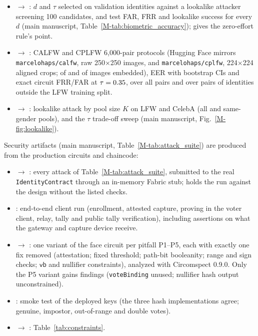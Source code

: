 \documentclass[10pt,letterpaper,journal]{IEEEtran}
\begin{document}
\begin{itemize}[leftmargin=*,noitemsep]
  \item {} $\rightarrow$ : $d$ and $\tau$ selected on validation identities against a lookalike attacker screening 100 candidates, and test FAR, FRR and lookalike success for every $d$ (main manuscript, Table~\ref{M-tab:biometric_accuracy});  gives the zero-effort rule's point.
  \item {} $\rightarrow$ : CALFW and CPLFW 6,000-pair protocols (Hugging Face mirrors \texttt{marcelohaps/calfw}, raw 250$\times$250 images, and \texttt{marcelohaps/cplfw}, 224$\times$224 aligned crops; \nCalfwEmbedded{} of \nCalfwImages{} and \nCplfwEmbedded{} of \nCplfwImages{} images embedded), EER with bootstrap CIs and exact circuit FRR/FAR at $\tau = 0.35$, over all pairs and over pairs of identities outside the LFW training split.
  \item {} $\rightarrow$ : lookalike attack by pool size $K$ on LFW and CelebA (all and same-gender pools), and the $\tau$ trade-off sweep (main manuscript, Fig.~\ref{M-fig:lookalike}).
\end{itemize}
Security artifacts (main manuscript, Table~\ref{M-tab:attack_suite}) are produced from the production circuits and chaincode:
\begin{itemize}[leftmargin=*,noitemsep]
  \item {} $\rightarrow$ : every attack of Table~\ref{M-tab:attack_suite}, submitted to the real \texttt{IdentityContract} through an in-memory Fabric stub;  holds the run against the design without the listed checks.
  \item {}: end-to-end client run (enrollment, attested capture, proving in the voter client, relay, tally and public tally verification), including assertions on what the gateway and capture device receive.
  \item {} $\rightarrow$ : one variant of the face circuit per pitfall P1--P5, each with exactly one fix removed (attestation; fixed threshold; path-bit booleanity; range and sign checks; $\mathsf{vb}$ and nullifier constraints), analyzed with Circomspect 0.9.0. Only the P5 variant gains findings (\texttt{voteBinding} unused; nullifier hash output unconstrained).
  \item {}: smoke test of the deployed keys (the three hash implementations agree; genuine, impostor, out-of-range and double votes).
  \item {} $\rightarrow$ : Table~\ref{tab:constraints}.
\end{itemize}
\end{document}
